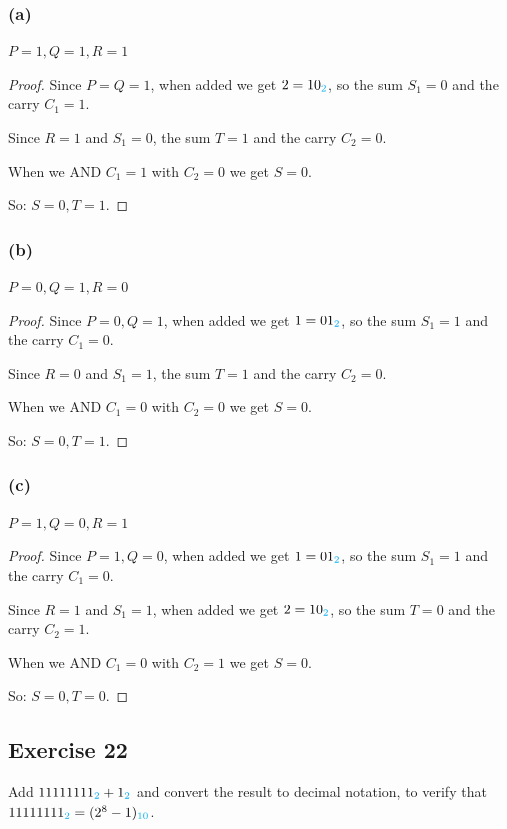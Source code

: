 \documentclass[14pt]{extarticle}
\newcommand{\base}[1]{{\color{cyan}#1}}
\begin{document}
\subsubsection{(a)} 
$P = 1, Q = 1, R = 1$

\begin{proof} 
Since $P = Q = 1$, when added we get $2 = 10_\base{2}$, so the sum $S_1 = 0$ and the carry $C_1 = 1$.

Since $R = 1$ and $S_1 = 0$, the sum $T = 1$ and the carry $C_2 = 0$.

When we AND $C_1 = 1$ with $C_2 = 0$ we get $S = 0$.

So: $S = 0, T = 1$. 
\end{proof}

\subsubsection{(b)} 
$P = 0, Q = 1, R = 0$

\begin{proof} 
Since $P = 0, Q = 1$, when added we get $1 = 01_\base{2}$, so the sum $S_1 = 1$ and the carry $C_1 = 0$.

Since $R = 0$ and $S_1 = 1$, the sum $T = 1$ and the carry $C_2 = 0$.

When we AND $C_1 = 0$ with $C_2 = 0$ we get $S = 0$.

So: $S = 0, T = 1$. 
\end{proof}

\subsubsection{(c)} 
$P = 1, Q = 0, R = 1$

\begin{proof} 
Since $P = 1, Q = 0$, when added we get $1 = 01_\base{2}$, so the sum $S_1 = 1$ and the carry $C_1 = 0$.

Since $R = 1$ and $S_1 = 1$, when added we get $2 = 10_\base{2}$, so the sum $T = 0$ and the carry $C_2 = 1$.

When we AND $C_1 = 0$ with $C_2 = 1$ we get $S = 0$.

So: $S = 0, T = 0$. 
\end{proof}

\subsection{Exercise 22} 
Add $11111111_\base{2} + 1_\base{2}$ and convert the result to decimal notation, to verify that \\ $11111111_\base{2} = (2^8 -
1)_\base{10}$.
\end{document}
